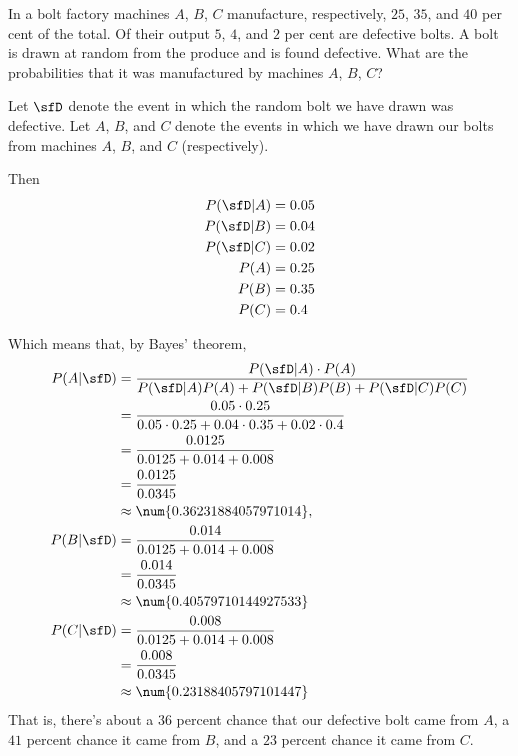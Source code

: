 \begin{problem}[Handout 4, \# 8]
  In a bolt factory machines \(A\), \(B\), \(C\) manufacture, respectively,
  \(25\), \(35\), and \(40\) per cent of the total. Of their output \(5\),
  \(4\), and \(2\) per cent are defective bolts. A bolt is drawn at random
  from the produce and is found defective. What are the probabilities that
  it was manufactured by machines \(A\), \(B\), \(C\)?
\end{problem}
\begin{solution}
  Let $\sfD$ denote the event in which the random bolt we have drawn was
  defective. Let $A$, $B$, and $C$ denote the events in which we have drawn
  our bolts from machines $A$, $B$, and $C$ (respectively).

  Then
  \begin{align*}
    P(\sfD|A) &=0.05 \\
    P(\sfD|B) &=0.04 \\
    P(\sfD|C) &=0.02 \\
    P(A)&=0.25 \\
    P(B)&=0.35 \\
    P(C)&=0.4 \\
  \end{align*}

  Which means that, by Bayes' theorem,
  \begin{align*}
    P(A|\sfD) &=\frac{P(\sfD|A)\cdot P(A)}{P(\sfD|A)P(A)
                  +P(\sfD|B)P(B)+P(\sfD|C)P(C)} \\
                &=\frac{0.05 \cdot 0.25}{0.05 \cdot 0.25 + 0.04 \cdot 0.35 + 0.02 \cdot 0.4 } \\
                &= \frac{0.0125}{0.0125 + 0.014 + 0.008} \\
                &= \frac{0.0125}{0.0345} \\
                &\approx \num{0.36231884057971014}, \\
    P(B|\sfD) &= \frac{0.014}{0.0125 + 0.014 + 0.008} \\
                &= \frac{0.014}{0.0345} \\
                &\approx \num{0.40579710144927533} \\
    P(C|\sfD) &= \frac{0.008}{0.0125 + 0.014 + 0.008} \\
                &= \frac{0.008}{0.0345} \\
                &\approx \num{0.23188405797101447}\\
  \end{align*}
  That is, there's about a $36$ percent chance that our defective bolt came
  from $A$, a $41$ percent chance it came from $B$, and a $23$ percent
  chance it came from $C$.
\end{solution}
\newpage

